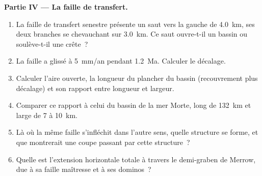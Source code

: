 \begin{problem}
\medskip\noindent\textbf{Partie IV --- La faille de transfert.}
\begin{enumerate}[resume]
  \item La faille de transfert senestre présente un saut vers la gauche de \qty{4.0}{km}, ses deux
        branches se chevauchant sur \qty{3.0}{km}. Ce saut ouvre-t-il un bassin
        ou soulève-t-il une crête~?
  \item La faille a glissé à \qty{5}{mm/an} pendant \qty{1.2}{Ma}. Calculer
        le décalage.
  \item Calculer l'aire ouverte, la longueur du plancher du bassin (recouvrement plus
        décalage) et son rapport entre longueur et largeur.
  \item Comparer ce rapport à celui du bassin de la mer Morte, long de \qty{132}{km} et large de 7
        à \qty{10}{km}.
  \item Là où la même faille s'infléchit dans l'autre sens, quelle structure se forme, et
        que montrerait une coupe passant par cette structure~?
  \item Quelle est l'extension horizontale totale à travers le demi-graben de Merrow,
        due à sa faille maîtresse et à ses dominos~?
\end{enumerate}
\end{problem}
